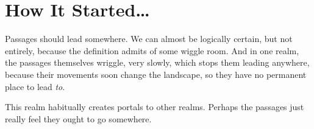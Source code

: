 \chapter[How It Started]{How It Started\ldots}

\begin{center}
\begin{minipage}{0.7\linewidth}
Passages should lead somewhere.
We can almost be logically certain, but not entirely, because the definition admits of some wiggle room.
And in one realm, the passages themselves wriggle, very slowly, which stops them leading anywhere, because their movements soon change the landscape, so they have no permanent place to lead \emph{to}.

This realm habitually creates portals to other realms.
Perhaps the passages just really feel they ought to go somewhere.
\end{minipage}
\end{center}

